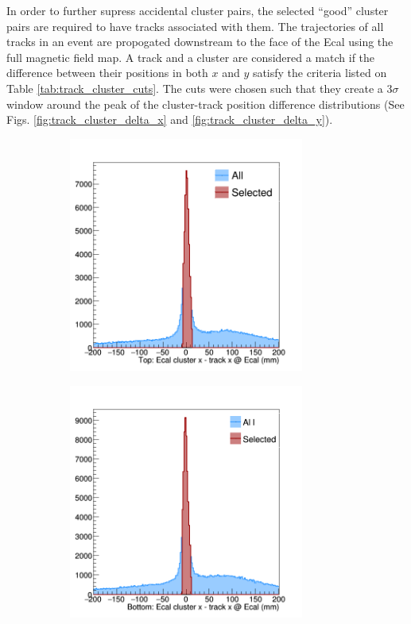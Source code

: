 In order to further supress accidental cluster pairs, the 
selected ``good'' cluster pairs are required to have tracks associated 
with them. The trajectories of all tracks in an event are propogated downstream
to the face of the Ecal using the full magnetic field map.  A track and a cluster
are considered a match if the difference between their positions in both $x$ 
and $y$ satisfy the criteria listed on Table \ref{tab:track_cluster_cuts}. The 
cuts were chosen such that they create a 3$\sigma$ window around the peak of 
the cluster-track position difference distributions 
(See Figs. \ref{fig:track_cluster_delta_x} and \ref{fig:track_cluster_delta_y}).
\begin{figure}[h]
    \begin{subfigure}{.5\textwidth}
        \centering
        \includegraphics[width=0.85\textwidth]{images/20160502_pass4_cluster_track_delta_x_top.png}
    \end{subfigure}
    \begin{subfigure}{.5\textwidth}
        \centering
        \includegraphics[width=0.85\textwidth]{images/20160502_pass4_cluster_track_delta_x.png}

\end{subfigure}
\end{figure}
